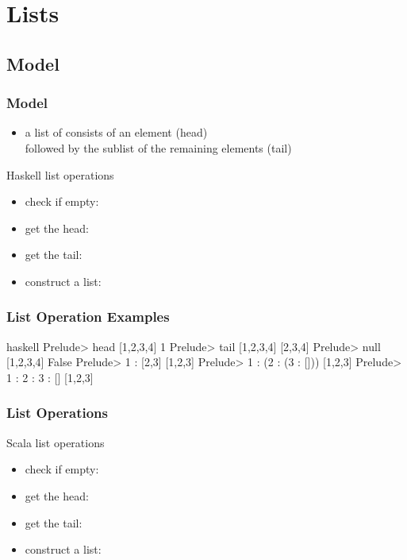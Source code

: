 \documentclass[dvipsnames]{beamer}
\theoremstyle{plain}
\begin{document}
\section{Lists}

\subsection{Model}

\begin{frame}
  \frametitle{Model}

  \begin{itemize}
    \item a list of consists of an element (\alert{head})\\
      followed by the sublist of the remaining elements (\alert{tail})
  \end{itemize}

  \pause
  \medskip
  \begin{block}{Haskell list operations}
    \begin{itemize}
      \item check if empty: 
      \item get the head: 
      \item get the tail: 
      \item construct a list: 
    \end{itemize}
  \end{block}
\end{frame}

\begin{frame}[fragile]
  \frametitle{List Operation Examples}

  \begin{example}[Haskell]
    \begin{pygments}{haskell}
Prelude> head [1,2,3,4]
1
Prelude> tail [1,2,3,4]
[2,3,4]
Prelude> null [1,2,3,4]
False
Prelude> 1 : [2,3]
[1,2,3]
Prelude> 1 : (2 : (3 : []))
[1,2,3]
Prelude> 1 : 2 : 3 : []
[1,2,3]
    \end{pygments}
  \end{example}
\end{frame}

\begin{frame}
  \frametitle{List Operations}

  \begin{block}{Scala list operations}
    \begin{itemize}
      \item check if empty: 
      \item get the head: 
      \item get the tail: 
      \item construct a list: 
    \end{itemize}
  \end{block}
\end{frame}
\end{document}
